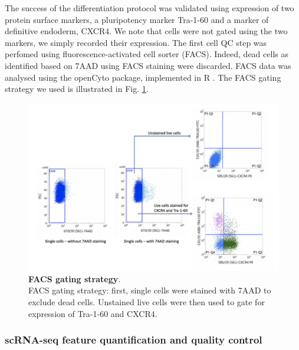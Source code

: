 The success of the differentiation protocol was validated using expression of two protein surface markers, a pluripotency marker Tra-1-60 and a marker of definitive endoderm, CXCR4. 
We note that cells were not gated using the two markers, we simply recorded their expression. 
The first cell QC step was perfomed using fluorescence-activated cell sorter (FACS).
Indeed, dead cells as identified based on 7AAD using FACS staining were discarded. 
FACS data was analysed using the openCyto package, implemented in R \cite{finak2014opencyto}.
The FACS gating strategy we used is illustrated in Fig. \ref{fig:endodiff_facs_strategy}.

\begin{figure}[h]
\centering
\includegraphics[width=14cm]{Chapter4/Fig/endodiff_facs_strategy.png}
\caption[FACS gating strategy]{\textbf{FACS gating strategy}.\\
FACS gating strategy: first, single cells were stained with 7AAD to exclude dead cells. 
Unstained live cells were then used to gate for expression of Tra-1-60 and CXCR4.}
\label{fig:endodiff_facs_strategy}
\end{figure}


\newpage


\subsubsection{scRNA-seq feature quantification and quality control}

